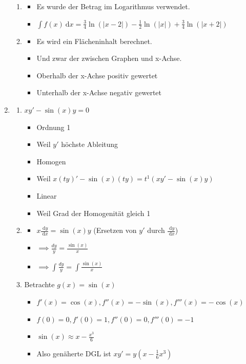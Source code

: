 \documentclass[11pt]{article}
\providecommand\d{}
\renewcommand{\d}[1]{\:\mathrm{d}{#1}}
\begin{document}
\begin{enumerate}
\begin{enumerate}
\item 
\begin{itemize}
\item Es wurde der Betrag im Logarithmus verwendet.
\item $\int f(x)\d x = \frac{3}{4} \ln(|x-2|) - \frac{1}{2} \ln(|x|) + \frac{3}{4}\ln(|x+2|)$
\end{itemize}

\item 
\begin{itemize}
\item Es wird ein Flächeninhalt berechnet.
\item Und zwar der zwischen Graphen und x-Achse.
\item Oberhalb der x-Achse positiv gewertet
\item Unterhalb der x-Achse negativ gewertet
\end{itemize}

\end{enumerate}



\item
\begin{enumerate}

\item $xy'-\sin(x)y = 0$
\begin{itemize}
\item Ordnung 1
\item Weil $y'$ höchste Ableitung
\item Homogen
\item Weil $x(ty)'-\sin(x)(ty) = t^1(xy'-\sin(x)y)$
\item Linear
\item Weil Grad der Homogenität gleich 1
\end{itemize}

\item 
\begin{itemize}
\item $x \frac{\d y}{\d x} = \sin(x)y$ (Ersetzen von $y'$ durch $\frac{\d y}{\d x}$)
\item $\implies \frac{dy}{y} = \frac{\sin(x)}{x}$
\item $\implies \int\frac{dy}{y} = \int\frac{\sin(x)}{x}$
\end{itemize}

\item Betrachte $g(x)=\sin(x)$
\begin{itemize}
\item $f'(x) = \cos(x), f''(x) = -\sin(x), f'''(x) = -\cos(x)$
\item $f(0) = 0, f'(0) = 1, f''(0) = 0, f'''(0) = -1$
\item $\sin(x) \approx x -\frac{x^3}{6}$
\item Also genäherte DGL ist $xy'=y(x-\frac{1}{6}x^3)$
\end{itemize}


\end{enumerate}
\end{enumerate}
\end{document}
